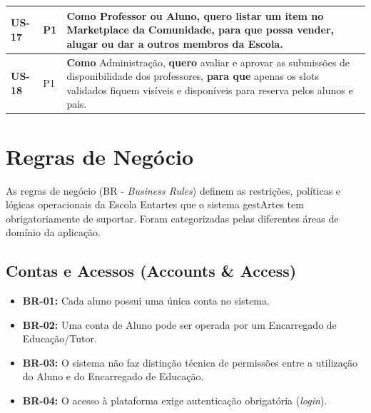 \documentclass[12pt,a4paper]{report}
\begin{document}
\begin{longtable}{@{}p{} | p{} | p{}@{}}
\textbf{US-17} & P1 & \textbf{Como} Professor ou Aluno, \textbf{quero} listar um item no Marketplace da Comunidade, \textbf{para que} possa vender, alugar ou dar a outros membros da Escola. \\ \midrule

\textbf{US-18} & P1 & \textbf{Como} Administração, \textbf{quero} avaliar e aprovar as submissões de disponibilidade dos professores, \textbf{para que} apenas os slots validados fiquem visíveis e disponíveis para reserva pelos alunos e pais. \\ \bottomrule

\end{longtable}


\chapter{Regras de Negócio}

As regras de negócio (BR - \textit{Business Rules}) definem as restrições, políticas e lógicas operacionais da Escola Entartes que o sistema gestArtes tem obrigatoriamente de suportar. Foram categorizadas pelas diferentes áreas de domínio da aplicação.

\section{Contas e Acessos (Accounts \& Access)}
\begin{itemize}
    \item \textbf{BR-01:} Cada aluno possui uma única conta no sistema.
    \item \textbf{BR-02:} Uma conta de Aluno pode ser operada por um Encarregado de Educação/Tutor.
    \item \textbf{BR-03:} O sistema não faz distinção técnica de permissões entre a utilização do Aluno e do Encarregado de Educação.
    \item \textbf{BR-04:} O acesso à plataforma exige autenticação obrigatória (\textit{login}).
\end{itemize}
\end{document}
